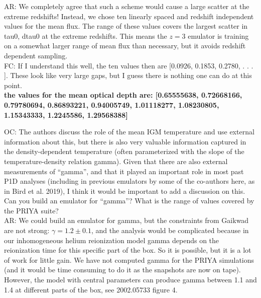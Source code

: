 \documentclass[12pt]{article}
\begin{document}
AR: We completely agree that such a scheme would cause a large scatter at the extreme redshifts! Instead, we chose ten linearly spaced and redshift independent values for the mean flux. The range of these values covers the largest scatter in tau0, dtau0 at the extreme redshifts. This means the $z=3$ emulator is training on a somewhat larger range of mean flux than necessary, but it avoids redshift dependent sampling.\\

FC: If I understand this well, the ten values then are [0.0926, 0.1853, 0.2780, . . . ]. These look like very large gaps, but I guess there is nothing one can do at this point.\\

\textbf{the values for the mean optical depth are: [0.65555638, 0.72668166, 0.79780694, 0.86893221, 0.94005749, 1.01118277, 1.08230805, 1.15343333, 1.2245586, 1.29568388]}\\

\hrulefill \newline

OC: The authors discuss the role of the mean IGM temperature and use external information about this, but there is also very valuable information captured in the density-dependent temperature (often parameterized with the slope of the temperature-density relation gamma). Given that there are also external measurements of “gamma”, and that it played an important role in most past P1D analyses (including in previous emulators by some of the co-authors here, as in Bird et al. 2019), I think it would be important to add a discussion on this. Can you build an emulator for “gamma”? What is the range of values covered by the PRIYA suite?\\

AR: We could build an emulator for gamma, but the constraints from Gaikwad are not strong: $\gamma = 1.2\pm 0.1$, and the analysis would be complicated because in our inhomogeneous helium reionization model gamma depends on the reionization time for this specific part of the box. So it is possible, but it is a lot of work for little gain. We have not computed gamma for the PRIYA simulations (and it would be time consuming to do it as the snapshots are now on tape). However, the model with central parameters can produce gamma between 1.1 and 1.4 at different parts of the box, see 2002.05733 figure 4.\\
\end{document}
